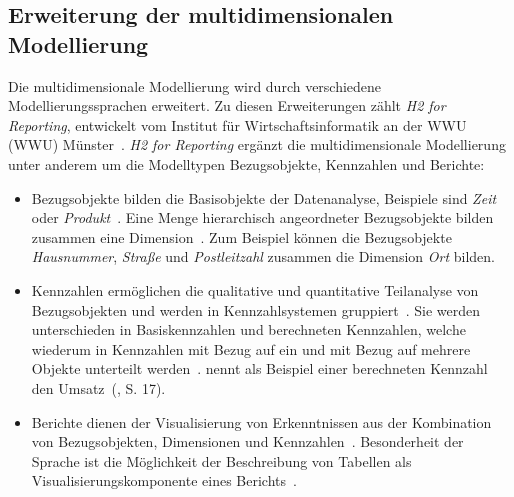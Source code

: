 \documentclass[
  language=german, %
  type=bachelor,%
  ngerman
]{isthesis}
\begin{document}
\begin{content}
	\subsection{Erweiterung der multidimensionalen Modellierung}

	Die multidimensionale Modellierung wird durch verschiedene
	Modellierungssprachen erweitert. Zu diesen Erweiterungen zählt \textit{H2 for
	Reporting}, entwickelt vom Institut für Wirtschaftsinformatik an der
	\acrlong{WWU} (\acrshort{WWU}) Münster~\cite[][S. 59 -
	78]{janiesch2007contextual}. \textit{H2 for Reporting} ergänzt die
	multidimensionale Modellierung unter anderem um die Modelltypen
	Bezugsobjekte, Kennzahlen und Berichte: 

	\begin{itemize}

		\item Bezugsobjekte bilden die Basisobjekte der Datenanalyse, Beispiele
		sind \textit{Zeit} oder \textit{Produkt}~\cite[][S.  5]{becker2007h2}. Eine
		Menge hierarchisch angeordneter Bezugsobjekte bilden zusammen eine
		Dimension~\cite[][S.  88]{becker2012fachkonzeptionelle}. Zum Beispiel
		können die Bezugsobjekte \textit{Hausnummer}, \textit{Straße} und
		\textit{Postleitzahl} zusammen die Dimension \textit{Ort} bilden.

		\item Kennzahlen ermöglichen die qualitative und quantitative Teilanalyse
		von Bezugsobjekten und werden in Kennzahlsystemen
		gruppiert~\cite[][S.88]{becker2012fachkonzeptionelle}. Sie werden
		unterschieden in Basiskennzahlen und berechneten Kennzahlen, welche
		wiederum in Kennzahlen mit Bezug auf ein und mit Bezug auf mehrere Objekte
		unterteilt werden~\cite[][S.  15]{becker2007h2}.
		\textsc{\citeauthor{becker2007h2}} nennt als Beispiel einer berechneten
		Kennzahl den Umsatz~(\cite{becker2007h2}, S. 17).

		\item Berichte dienen der Visualisierung von Erkenntnissen aus der
		Kombination von Bezugsobjekten, Dimensionen und Kennzahlen~\cite[][S.
		23]{becker2007h2}. Besonderheit der Sprache ist die Möglichkeit der
		Beschreibung von Tabellen als Visualisierungskomponente eines
		Berichts~\cite[][S. 86]{becker2012fachkonzeptionelle}.


\end{itemize}
\end{content}
\end{document}
